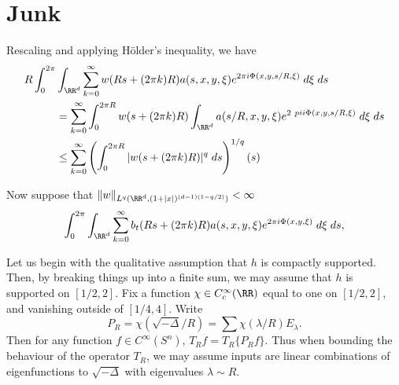 \section{Junk}

Rescaling and applying H\"{o}lder's inequality, we have
%
\begin{align*}
    R \int_0^{2\pi} & \int_{\RR^d} \sum_{k = 0}^\infty w(R s + (2 \pi k) R) a(s,x,y,\xi) e^{2 \pi i \Phi(x,y,s/R,\xi)}\; d\xi\; ds\\
    &= \sum_{k = 0}^\infty \int_0^{2 \pi R} w(s + (2 \pi k) R) \int_{\RR^d} a(s/R,x,y,\xi) e^{2\ pi i \Phi(x,y,s/R,\xi)}\; d\xi\; ds\\
    &\leq \sum_{k = 0}^\infty \left( \int_0^{2\pi R} |w(s + (2 \pi k) R)|^q\; ds \right)^{1/q} \left( s \right)
\end{align*}


Now suppose that $\| w \|_{L^q(\RR^d, (1 + |x|)^{(d-1)(1 - q/2)})} < \infty$
%
\[ \int_0^{2\pi} \int_{\RR^d} \sum_{k = 0}^\infty b_t(R s + (2 \pi k) R) a(s,x,y,\xi) e^{2 \pi i \Phi(x,y,\xi)}\; d\xi\; ds, \]

Let us begin with the qualitative assumption that $h$ is compactly supported. Then, by breaking things up into a finite sum, we may assume that $h$ is supported on $[1/2,2]$. Fix a function $\chi \in C_c^\infty(\RR)$ equal to one on $[1/2,2]$, and vanishing outside of $[1/4,4]$. Write
%
\[ P_R = \chi \left( \sqrt{-\Delta} / R \right) = \sum \chi(\lambda / R) E_\lambda. \]
%
Then for any function $f \in C^\infty(S^n)$, $T_R f = T_R \{ P_R f \}$. Thus when bounding the behaviour of the operator $T_R$, we may assume inputs are linear combinations of eigenfunctions to $\sqrt{-\Delta}$ with eigenvalues $\lambda \sim R$.





